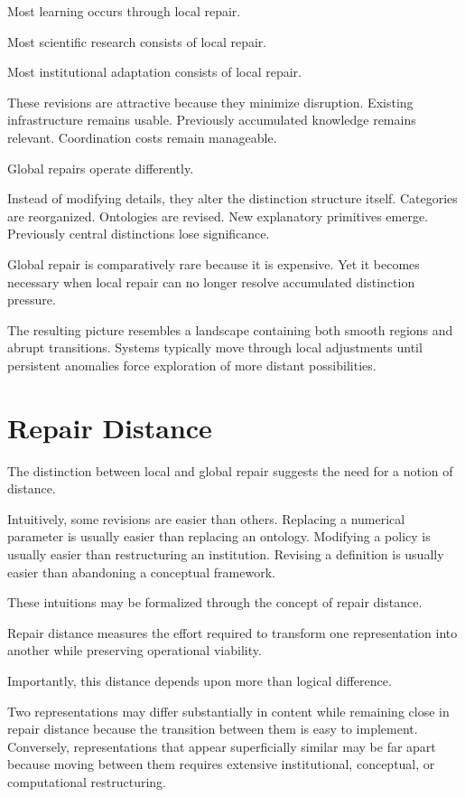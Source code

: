 \documentclass[11pt,oneside,openany]{book}
\begin{document}
Most learning occurs through local repair.

Most scientific research consists of local repair.

Most institutional adaptation consists of local repair.

These revisions are attractive because they minimize disruption. Existing infrastructure remains usable. Previously accumulated knowledge remains relevant. Coordination costs remain manageable.

Global repairs operate differently.

Instead of modifying details, they alter the distinction structure itself. Categories are reorganized. Ontologies are revised. New explanatory primitives emerge. Previously central distinctions lose significance.

Global repair is comparatively rare because it is expensive. Yet it becomes necessary when local repair can no longer resolve accumulated distinction pressure.

The resulting picture resembles a landscape containing both smooth regions and abrupt transitions. Systems typically move through local adjustments until persistent anomalies force exploration of more distant possibilities.

\section{Repair Distance}

The distinction between local and global repair suggests the need for a notion of distance.

Intuitively, some revisions are easier than others. Replacing a numerical parameter is usually easier than replacing an ontology. Modifying a policy is usually easier than restructuring an institution. Revising a definition is usually easier than abandoning a conceptual framework.

These intuitions may be formalized through the concept of repair distance.

Repair distance measures the effort required to transform one representation into another while preserving operational viability.

Importantly, this distance depends upon more than logical difference.

Two representations may differ substantially in content while remaining close in repair distance because the transition between them is easy to implement. Conversely, representations that appear superficially similar may be far apart because moving between them requires extensive institutional, conceptual, or computational restructuring.
\end{document}
